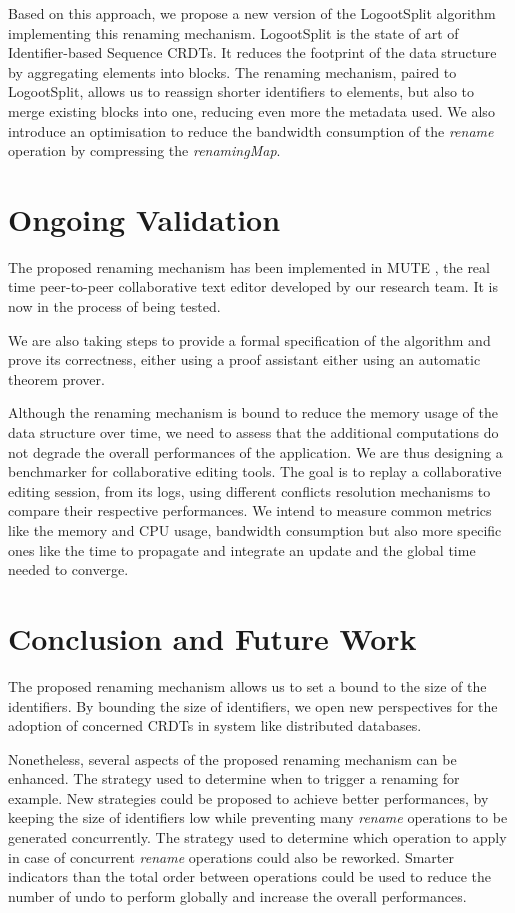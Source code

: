 \documentclass[sigplan]{acmart}
\begin{document}
Based on this approach, we propose a new version of the LogootSplit \cite{AndreCollaborateCom2013} algorithm implementing this renaming mechanism.
LogootSplit is the state of art of Identifier-based Sequence \acp{CRDT}.
It reduces the footprint of the data structure by aggregating elements into blocks.
The renaming mechanism, paired to LogootSplit, allows us to reassign shorter identifiers to elements, but also to merge existing blocks into one, reducing even more the metadata used.
We also introduce an optimisation to reduce the bandwidth consumption of the \emph{rename} operation by compressing the \emph{renamingMap}.

\section{Ongoing Validation}

The proposed renaming mechanism has been implemented in MUTE \cite{nicolas:hal-01655438}, the real time peer-to-peer collaborative text editor developed by our research team.
It is now in the process of being tested.

We are also taking steps to provide a formal specification of the algorithm and prove its correctness, either using a proof assistant either using an automatic theorem prover.

Although the renaming mechanism is bound to reduce the memory usage of the data structure over time, we need to assess that the additional computations do not degrade the overall performances of the application.
We are thus designing a benchmarker for collaborative editing tools.
The goal is to replay a collaborative editing session, from its logs, using different conflicts resolution mechanisms to compare their respective performances.
We intend to measure common metrics like the memory and CPU usage, bandwidth consumption but also more specific ones like the time to propagate and integrate an update and the global time needed to converge.

\section{Conclusion and Future Work}

The proposed renaming mechanism allows us to set a bound to the size of the identifiers.
By bounding the size of identifiers, we open new perspectives for the adoption of concerned \acp{CRDT} in system like distributed databases.

Nonetheless, several aspects of the proposed renaming mechanism can be enhanced.
The strategy used to determine when to trigger a renaming for example.
New strategies could be proposed to achieve better performances, by keeping the size of identifiers low while preventing many \emph{rename} operations to be generated concurrently.
The strategy used to determine which operation to apply in case of concurrent \emph{rename} operations could also be reworked. Smarter indicators than the total order between operations could be used to reduce the number of undo to perform globally and increase the overall performances.



\end{document}
